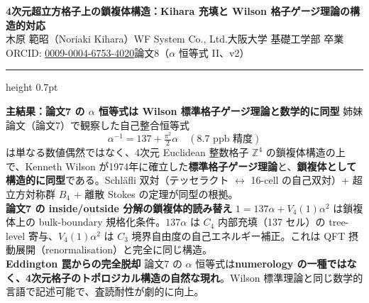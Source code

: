 \documentclass[9pt,a4paper]{ltjsarticle}
\begin{document}
\begin{center}
{\Large\bfseries 4次元超立方格子上の鎖複体構造：Kihara 充填と Wilson 格子ゲージ理論の構造的対応}\\[2pt]
{\small 木原 範昭（Noriaki Kihara）\enspace WF System Co., Ltd.\enspace 大阪大学 基礎工学部 卒業\enspace ORCID: \href{https://orcid.org/0009-0004-6753-4020}{0009-0004-6753-4020}\enspace 論文8（$\alpha$ 恒等式 II、v2）}
\end{center}

\vspace{-1pt}
\hrule height 0.7pt
\vspace{4pt}

\begin{tcolorbox}[colback=gray!7,colframe=gray!55,boxrule=0.4pt,arc=2pt,left=4pt,right=4pt,top=2pt,bottom=2pt]
{\small
\textbf{主結果：論文7 の $\alpha$ 恒等式は Wilson 標準格子ゲージ理論と数学的に同型}\enspace
姉妹論文（論文7）で観察した自己整合恒等式
\[ \alpha^{-1} = 137 + \tfrac{\pi^2}{2}\alpha \quad (\text{8.7 ppb 精度}) \]
は単なる数値偶然ではなく、4次元 Euclidean 整数格子 $\mathbb{Z}^4$ の鎖複体構造の上で、Kenneth Wilson が1974年に確立した\textbf{標準格子ゲージ理論}と、\textbf{鎖複体として構造的に同型}である。Schl\"afli 双対（テッセラクト $\leftrightarrow$ 16-cell の自己双対）+ 超立方対称群 $B_4$ + 離散 Stokes の定理が同型の根拠。\\[2pt]
\textbf{論文7 の inside/outside 分解の鎖複体的読み替え}\enspace
$1 = 137\alpha + V_4(1)\alpha^2$ は鎖複体上の bulk-boundary 規格化条件。$137\alpha$ は $C_4$ 内部充填（137 セル）の tree-level 寄与、$V_4(1)\alpha^2$ は $C_3$ 境界自由度の自己エネルギー補正。これは QFT 摂動展開（renormalisation）と完全に同じ構造。\\[2pt]
\textbf{Eddington 罠からの完全脱却}\enspace
論文7 の $\alpha$ 恒等式は\textbf{numerology の一種ではなく、4次元格子のトポロジカル構造の自然な現れ}。Wilson 標準理論と同じ数学的言語で記述可能で、査読耐性が劇的に向上。}
\end{tcolorbox}

\vspace{2pt}
\end{document}
